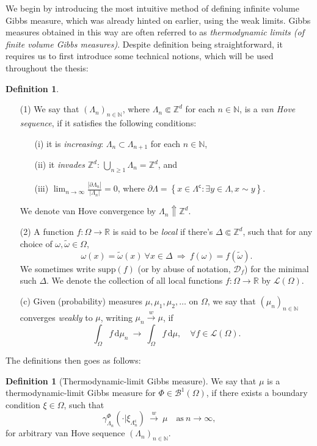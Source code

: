 \documentclass[12pt]{article}
\newcommand{\BB}{\mathscr{B}}
\newcommand{\D}{\mathcal{D}}
\renewcommand{\d}{\mathrm{d}}
\newcommand{\Loc}{\mathcal{L}}
\newcommand{\N}{\mathbb{N}}
\newcommand{\R}{\mathbb{R}}
\newcommand{\Z}{\mathbb{Z}}
\newcommand{\set}[1]{\left\{#1\right\}}
\newcommand{\ra}{\rightarrow}
\newcommand{\pika}{\boldsymbol{\cdot}}
\newcommand{\1}{\mathbbm{1}}
\renewcommand{\c}{\mathsf{c}}
\newcommand{\supp}{\mathrm{supp}}
\newcommand{\5}{\vspace{0.5cm}}
\renewcommand{\tilde}{\widetilde}
\theoremstyle{definition}
\newtheorem{df}[thm]{Definition}
\begin{document}
We begin by introducing the most intuitive method of defining infinite volume Gibbs measure, which was already hinted on earlier, using the weak limits. Gibbs measures obtained in this way are often referred to as \textit{thermodynamic limits (of finite volume Gibbs measures)}. Despite definition being straightforward, it requires us to first introduce some technical notions, which will be used throughout the thesis:

\begin{df}
~
\begin{itemize}
	\item[(1)] We say that $(\Lambda_n)_{n\in\N}$, where $\Lambda_n\Subset\Z^d$ for each $n\in\N$, is a \textit{van Hove sequence}, if it satisfies the following conditions:
	\begin{itemize}
		\item[(i)] it is \textit{increasing}: $\Lambda_n\subset\Lambda_{n+1}$ for each $n\in\N$,
		\item[(ii)] it \textit{invades} $\Z^d$: $\bigcup_{n\geq 1}\Lambda_n=\Z^d$, and
		\item[(iii)] $\lim_{n\ra\infty}\frac{|\partial\Lambda_n|}{|\Lambda_n|}=0$, where $\partial \Lambda=\set{x\in\Lambda^\c:\exists y\in\Lambda,x\sim y}$.
	\end{itemize}
	We denote van Hove convergence by $\Lambda_n\Uparrow\Z^d$.
	\item[(2)] A function $f:\Omega\ra\R$ is said to be \textit{local} if there's $\Delta\Subset\Z^d$, such that for any choice of $\omega,\tilde{\omega}\in\Omega$, 
	$$\omega(x)=\tilde{\omega}(x)~\forall x\in\Delta ~\Longrightarrow~ f(\omega)=f(\tilde{\omega}).$$
	We sometimes write $\supp(f)$ (or by abuse of notation, $\D_f$) for the minimal such $\Delta$. We denote the collection of all local functions $f:\Omega\ra\R$ by $\Loc(\Omega)$.
	\item[(c)] Given (probability) measures $\mu,\mu_1,\mu_2,\ldots$ on $\Omega$, we say that $(\mu_n)_{n\in\N}$ converges \textit{weakly} to $\mu$, writing $\mu_n\xrightarrow{w}\mu$, if
	$$\int_\Omega f\,\d\mu_n ~\ra~ \int_\Omega f\,\d\mu, \quad \forall f\in\Loc(\Omega).$$
\end{itemize}
\end{df}

The definitions then goes as follows:

\begin{df}[Thermodynamic-limit Gibbs measure]
We say that $\mu$ is a thermo\-dynamic-limit Gibbs measure for $\Phi\in\BB^1(\Omega)$, if there exists a boundary condition $\xi\in\Omega$, such that
$$\gamma_{\Lambda_n}^\Phi(\pika|\xi_{\Lambda_n^\c}) ~\xrightarrow{w}~ \mu \quad \text{as}~n\ra\infty,$$
for arbitrary van Hove sequence $(\Lambda_n)_{n\in\N}$.
\end{df}
\end{document}
